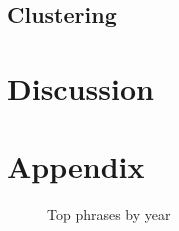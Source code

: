 \documentclass[hidelinks]{article}
\begin{document}
\begin{multicols}{2}
\subsection{Clustering}

\section{Discussion} %

\nocite{10.1145/2723372.2751523}


\section{Appendix} %
\begin{figure}
\caption{Top phrases by year}
\centering
{}
\label{figure:top_phrases_by_year}
\end{figure}

\begin{figure}
\ContinuedFloat
\centering
{}
\end{figure}
\end{multicols}
\end{document}
